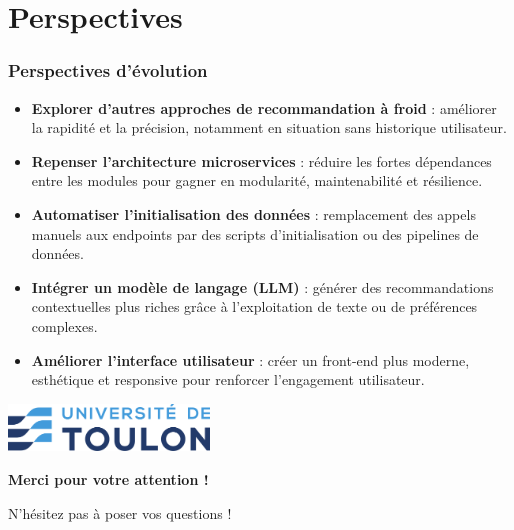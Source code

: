 \documentclass{beamer}
\begin{document}
\section{Perspectives}
\begin{frame}
    \frametitle{Perspectives d'évolution}
    \small
    \begin{itemize}
        \item \textbf{Explorer d'autres approches de recommandation à froid} :
        améliorer la rapidité et la précision, notamment en situation sans historique utilisateur.

        \item \textbf{Repenser l'architecture microservices} :
        réduire les fortes dépendances entre les modules pour gagner en modularité, maintenabilité et résilience.

        \item \textbf{Automatiser l’initialisation des données} :
        remplacement des appels manuels aux endpoints par des scripts d’initialisation ou des pipelines de données.

        \item \textbf{Intégrer un modèle de langage (LLM)} :
        générer des recommandations contextuelles plus riches grâce à l’exploitation de texte ou de préférences complexes.

        \item \textbf{Améliorer l’interface utilisateur} :
        créer un front-end plus moderne, esthétique et responsive pour renforcer l’engagement utilisateur.
    \end{itemize}
\end{frame}



\begin{frame}[c]
    \centering
    \includegraphics[width=0.4\textwidth]{logo.png}

    \vspace{1cm}
    {\Huge \textbf{Merci pour votre attention !}}

    \vspace{1.5cm}
    {\Large N'hésitez pas à poser vos questions !}
\end{frame}
\end{document}
